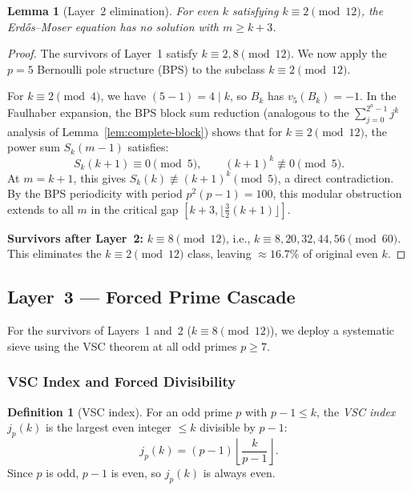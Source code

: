 \documentclass[12pt,a4paper]{article}
\theoremstyle{plain}
\newtheorem{lemma}[theorem]{Lemma}
\theoremstyle{definition}
\newtheorem{definition}[theorem]{Definition}
\begin{document}
\begin{lemma}[Layer~2 elimination]\label{lem:vsc-layer2}
  For even $k$ satisfying $k \equiv 2 \pmod{12}$, the Erd\H{o}s--Moser
  equation has no solution with $m \ge k+3$.
\end{lemma}

\begin{proof}
  The survivors of Layer~1 satisfy $k \equiv 2, 8 \pmod{12}$.  We now
  apply the $p = 5$ Bernoulli pole structure (BPS) to the subclass
  $k \equiv 2 \pmod{12}$.

  For $k \equiv 2 \pmod{4}$, we have $(5-1) = 4 \mid k$, so $B_k$ has
  $v_5(B_k) = -1$.  In the Faulhaber expansion, the BPS block sum
  reduction (analogous to the $\sum_{j=0}^{2^a-1} j^k$ analysis of
  Lemma~\ref{lem:complete-block}) shows that for $k \equiv 2 \pmod{12}$,
  the power sum $S_k(m-1)$ satisfies:
  \[\label{eq:bps-5}
    S_k(k+1) \equiv 0 \pmod{5},\qquad
    (k+1)^k \not\equiv 0 \pmod{5}.
  \]
  At $m = k+1$, this gives $S_k(k) \not\equiv (k+1)^k \pmod{5}$, a direct
  contradiction.  By the BPS periodicity with period $p^2(p-1) = 100$,
  this modular obstruction extends to all $m$ in the critical gap
  $[k+3, \lfloor\frac{3}{2}(k+1)\rfloor]$.

  \textbf{Survivors after Layer~2:} $k \equiv 8 \pmod{12}$, i.e.,
  $k \equiv 8, 20, 32, 44, 56 \pmod{60}$.  This eliminates the
  $k \equiv 2 \pmod{12}$ class, leaving $\approx 16.7\%$ of original
  even $k$.
\end{proof}

\subsection{Layer~3 --- Forced Prime Cascade}
\label{sec:layer3}

For the survivors of Layers~1 and~2 ($k \equiv 8 \pmod{12}$), we deploy
a systematic sieve using the VSC theorem at all odd primes $p \ge 7$.

\subsubsection{VSC Index and Forced Divisibility}

\begin{definition}[VSC index]\label{def:vsc-index}
  For an odd prime $p$ with $p-1 \le k$, the \emph{VSC index} $j_p(k)$
  is the largest even integer $\le k$ divisible by $p-1$:
  \[\label{eq:jp-def}
    j_p(k) = (p-1)\left\lfloor\frac{k}{p-1}\right\rfloor.
  \]
  Since $p$ is odd, $p-1$ is even, so $j_p(k)$ is always even.
\end{definition}
\end{document}
